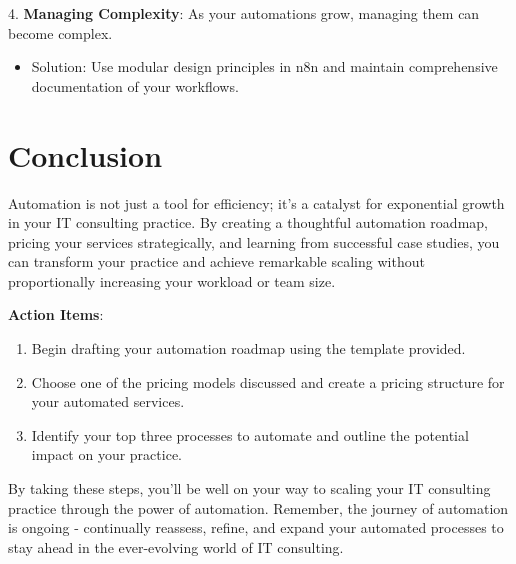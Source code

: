 4. \textbf{Managing Complexity}: As your automations grow, managing them can become complex.
\begin{itemize}
    \item Solution: Use modular design principles in n8n and maintain comprehensive documentation of your workflows.
\end{itemize}


\section{Conclusion}

Automation is not just a tool for efficiency; it's a catalyst for exponential growth in your IT consulting practice. By creating a thoughtful automation roadmap, pricing your services strategically, and learning from successful case studies, you can transform your practice and achieve remarkable scaling without proportionally increasing your workload or team size.

\textbf{Action Items}:
\begin{enumerate}
    \item Begin drafting your automation roadmap using the template provided.
    \item Choose one of the pricing models discussed and create a pricing structure for your automated services.
    \item Identify your top three processes to automate and outline the potential impact on your practice.
\end{enumerate}


By taking these steps, you'll be well on your way to scaling your IT consulting practice through the power of automation. Remember, the journey of automation is ongoing - continually reassess, refine, and expand your automated processes to stay ahead in the ever-evolving world of IT consulting.